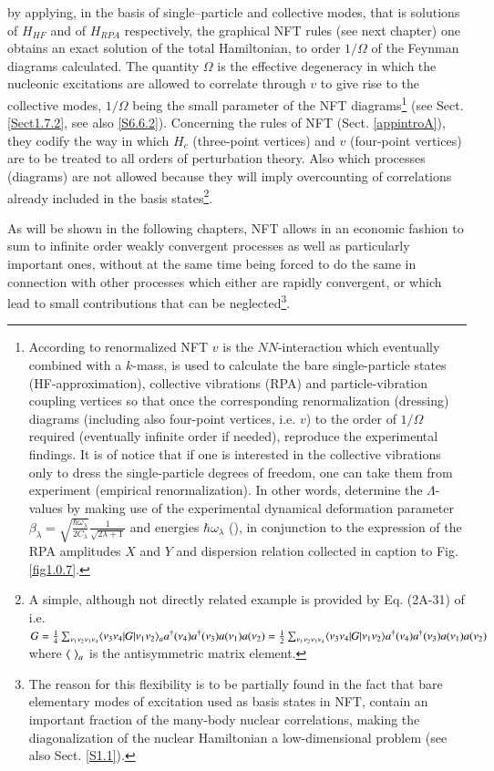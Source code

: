 by applying,  in the basis of single--particle and collective modes, that is solutions of $H_{HF}$ and of $H_{RPA}$ respectively, the graphical  NFT rules  (see next chapter) one obtains an exact solution of the total Hamiltonian, to order $1/\Omega$ of the Feynman diagrams calculated. The quantity $\Omega$ is the effective degeneracy in which the nucleonic excitations are allowed to correlate through $v$ to give rise to the collective modes, $1/\Omega$ being the small parameter of the NFT diagrams\footnote{According to renormalized NFT $v$ is the $NN$-interaction which eventually combined with a $k$-mass, is used to calculate the bare single-particle states (HF-approximation), collective vibrations (RPA) and particle-vibration coupling vertices so that once the corresponding renormalization (dressing) diagrams (including also four-point vertices, i.e. $v$) to the order of $1/\Omega$ required (eventually infinite order if needed), reproduce the experimental findings. It is of notice that if one is interested in the collective vibrations only to dress the single-particle degrees of freedom, one can take them from experiment (empirical renormalization). In other words, determine the $\Lambda$-values by making use of the experimental dynamical deformation parameter $\beta_\lambda=\sqrt{\frac{\hbar\omega_\lambda}{2C_\lambda}}\frac{1}{\sqrt{2\lambda+1}}$ and energies $\hbar\omega_\lambda$ (\cite{Broglia:16}), in conjunction to the expression of the RPA amplitudes $X$ and $Y$ and dispersion relation collected in caption to Fig. \ref{fig1.0.7}.} (see Sect. \ref{Sect1.7.2}, see also \ref{S6.6.2}). Concerning the rules of NFT (Sect. \ref{appintroA}), they codify the way in which $H_c$ (three-point vertices) and $v$ (four-point vertices) are to be treated to all orders of perturbation theory. Also which processes (diagrams) are not allowed because they will imply overcounting of correlations already included in the basis states\footnote{A simple, although not directly related example is provided by Eq. (2A-31) of \cite{Bohr:69} i.e. $G=\tfrac{1}{4}\sum_{\nu_1\nu_2\nu_3\nu_4}\langle {\nu_3\nu_4|G|\nu_1\nu_2} \rangle_ aa^\dagger(\nu_4)a^\dagger(\nu_3)a(\nu_1)a(\nu_2)=\tfrac{1}{2}\sum_{\nu_1\nu_2\nu_3\nu_4}\langle {\nu_3\nu_4|G|\nu_1\nu_2} \rangle a^\dagger(\nu_4)a^\dagger(\nu_3)a(\nu_1)a(\nu_2)$ where $\langle {\;} \rangle_a$ is the antisymmetric matrix element.}. 

As will be shown in the following chapters, NFT allows in an economic fashion to sum to infinite order weakly convergent processes as well as particularly important ones, without at the same time being forced to do the same in connection with other processes which either are rapidly convergent, or which lead to small contributions that can be neglected\footnote{The reason for this flexibility is to be partially found in the fact that bare elementary modes of excitation used as basis states in NFT, contain an important fraction of the many-body nuclear correlations, making the diagonalization of the nuclear Hamiltonian a low-dimensional problem (see also Sect. \ref{S1.1}).}.

